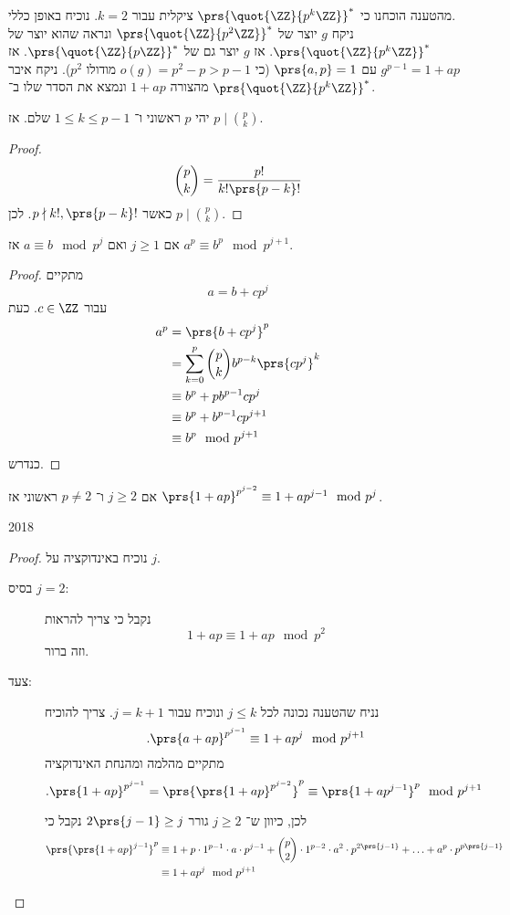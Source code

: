 \documentclass[a4paper,10pt,twoside,openany]{book}
\begin{document}
מהטענה הוכחנו כי
$\prs{\quot{\ZZ}{p^k\ZZ}}^*$
ציקלית עבור
$k=2$.
נוכיח באופן כללי.
\\
ניקח
$g$
יוצר של
$\prs{\quot{\ZZ}{p^2 \ZZ}}^*$
ונראה שהוא יוצר של
$\prs{\quot{\ZZ}{p^k\ZZ}}^*$.
אז
$g$
יוצר גם של
$\prs{\quot{\ZZ}{p\ZZ}}^*$.
אז
$g^{p-1} = 1 + ap$
עם
$\prs{a,p} = 1$
(כי
$o(g) = p^2 - p > p-1$
מודולו
$p^2$).
ניקח איבר מהצורה
$1 + ap$
ונמצא את הסדר שלו ב־%
$\prs{\quot{\ZZ}{p^k \ZZ}}^*$.

\begin{lemma}
יהי
$p$
ראשוני ו־%
$1 \leq k \leq p-1$
שלם.
אז
$p \mid \binom{p}{k}$.
\end{lemma}
\begin{proof}
\[\binom{p}{k} = \frac{p!}{k! \prs{p-k}!}\]
כאשר
$p \nmid k!, \prs{p-k}!$.
לכן
$p \mid \binom{p}{k}$.
\end{proof}
\begin{lemma}
אם
$j \geq 1$
ואם
$a \equiv b \mod{p^j}$
אז
$a^p \equiv b^p \mod{p^{j+1}}$.
\end{lemma}
\begin{proof}
מתקיים
\[a = b + cp^j\]
עבור
$c \in \ZZ$.
כעת
\begin{align*}
a^p &= \prs{b+cp^j}^p \\
&= \sum_{k=0}^p \binom{p}{k}b^{p-k} \prs{cp^j}^k \\
&\equiv b^p + pb^{p-1}cp^j \\
&\equiv b^p + b^{p-1}cp^{j+1} \\
&\equiv b^p \mod{p^{j+1}} 
\end{align*}
כנדרש.
\end{proof}
\begin{corollary}
אם
$j \geq 2$
ו־%
$p \neq 2$
ראשוני אז
$\prs{1+ap}^{p^{j-2}} \equiv 1 + ap^{j-1} \mod{p^j}$.
\end{corollary}

%
{2018}

\begin{proof}
נוכיח באינדוקציה על
$j$.

\begin{description}
\item[בסיס $j=2$:]

נקבל כי צריך להראות
\[1 + ap \equiv 1 + ap \mod{p^2}\]
וזה ברור.

\item[צעד:]
נניח שהטענה נכונה לכל
$j \leq k$
ונוכיח עבור
$j = k+1$.
צריך להוכיח
\[\text{.} \prs{a+ ap}^{p^{j-1}} \equiv 1 + ap^j \mod{p^{j+1}}\]
מתקיים מהלמה ומהנחת האינדוקציה
\[\text{.} \prs{1+ap}^{p^{j-1}} = \prs{\prs{1+ap}^{p^{j-2}}}^p \equiv \prs{1+ap^{j-1}}^p \mod{p^{j+1}}\]

לכן, כיוון ש־%
$j\geq 2$
גורר
$2\prs{j-1} \geq j$
נקבל כי
\begin{align*}
\prs{\prs{1+ap}^{j-1}}^p &\equiv 1 + p \cdot 1^{p-1} \cdot a \cdot p^{j-1} + \binom{p}{2} \cdot 1^{p-2} \cdot a^2 \cdot p^{2\prs{j-1}} + \ldots + a^p \cdot p^{p \prs{j-1}} \\&\equiv 1 + ap^j \mod{p^{j+1}}
\end{align*}

\end{description}
\end{proof}
\end{document}
